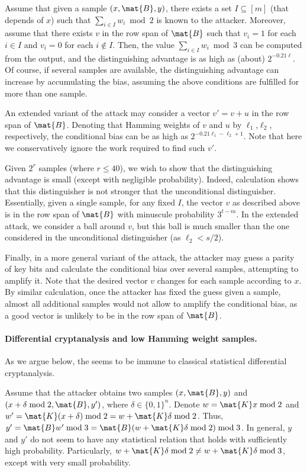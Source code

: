 Assume that given a sample $(x,\mat{B},y)$,
there exists a set $I \subseteq [m]$ (that depends of $x$)
such that $\sum_{i \in I} w_i \bmod 2$ is known to the attacker.
Moreover, assume that there exists $v$ in the row span of $\mat{B}$
such that $v_i = 1$ for each $i \in I$ and $v_i = 0$
for each $i \notin I$.
Then, the value $\sum_{i \in I} w_i \bmod 3$ can be computed from
the output, and the distinguishing advantage is as high as (about) $2^{-0.21\ell}$.
Of course, if several samples are available, the distinguishing advantage can
increase by accumulating the bias,
assuming the above conditions are fulfilled for more than one sample.

An extended variant of the attack may consider a vector
$v' = v + u$ in the row span of $\mat{B}$.
Denoting that Hamming weights of $v$ and $u$ by $\ell_1$,$\ell_2$, respectively,
the conditional bias can be as high as $2^{-0.21\ell_1 - \ell_2 + 1}$.
Note that here we conservatively ignore the work required to find such $v'$.

Given $2^r$ samples (where $r \leq 40$),
we wish to show that the distinguishing advantage is small
(except with negligible probability).
Indeed, calculation shows that this distinguisher is not stronger that the
unconditional distinguisher.
Essentially, given a single sample, for any fixed $I$, the vector $v$ as described above
is in the row span of $\mat{B}$ with minuscule probability $3^{t - m}$.
In the extended attack, we consider a ball around $v$, but this ball
is much smaller than the one considered in the unconditional distinguisher (as $\ell_2 < s/2$).

Finally, in a more general variant of the attack,
the attacker may guess a parity of key bits and calculate the conditional bias over several samples,
attempting to amplify it.
Note that the desired vector $v$ changes for each sample according to $x$.
By similar calculation, once the attacker has fixed the guess given a sample,
almost all additional samples would not allow to amplify the conditional bias,
as a good vector is unlikely to be in the row span of $\mat{B}$.

\paragraph{Differential cryptanalysis and low Hamming weight samples.}
As we argue below, the \ttwPRF seems to be immune to classical statistical differential cryptanalysis.

Assume that the attacker obtains two samples $(x,\mat{B},y)$ and $(x+\delta \bmod 2,\mat{B},y')$, where $\delta \in \{0,1\}^n$.
Denote $w = \mat{K} x \bmod 2$ and $w' = \mat{K} (x + \delta) \bmod 2 = w + \mat{K} \delta \bmod 2$.
Thus, $y' = \mat{B} w' \bmod 3 = \mat{B} (w + \mat{K} \delta \bmod 2 ) \bmod 3$.
In general, $y$ and $y'$ do not seem to have any statistical relation that holds with sufficiently high probability.
Particularly, $w + \mat{K} \delta \bmod 2 \neq w + \mat{K} \delta \bmod 3$,
except with very small probability.

